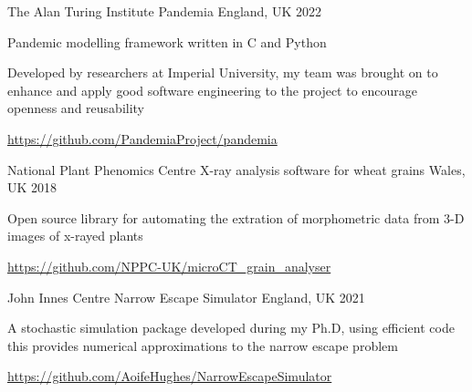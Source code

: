 

\begin{cventries}

  \cventry
    {The Alan Turing Institute} %
    {Pandemia} %
    {England, UK} %
    {2022} %
    {
      \begin{cvitems} %
        \item {Pandemic modelling framework written in C and Python}
        \item {Developed by researchers at Imperial University, my team was brought on to enhance and apply good software engineering to the project to encourage openness and reusability}
        \item {\url{https://github.com/PandemiaProject/pandemia}}
      \end{cvitems}
    }

  \cventry
    {National Plant Phenomics Centre} %
    {X-ray analysis software for wheat grains} %
    {Wales, UK} %
    {2018} %
    {
      \begin{cvitems} %
        \item {Open source library for automating the extration of morphometric data from 3-D images of x-rayed plants}
        \item {\url{https://github.com/NPPC-UK/microCT_grain_analyser} }
      \end{cvitems}
    }


  \cventry
    {John Innes Centre} %
    {Narrow Escape Simulator} %
    {England, UK} %
    {2021} %
    {
      \begin{cvitems} %
        \item {A stochastic simulation package developed during my Ph.D, using efficient code this provides numerical approximations to the narrow escape problem}
        \item {\url{https://github.com/AoifeHughes/NarrowEscapeSimulator}}
      \end{cvitems}
    }


\end{cventries}
